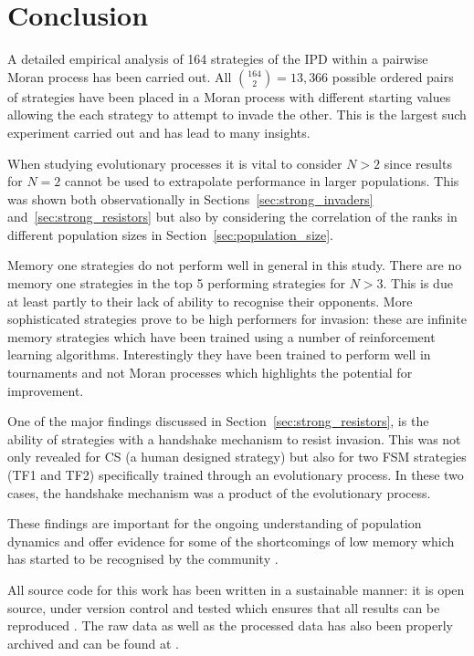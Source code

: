\documentclass{article}
\begin{document}
\section{Conclusion}\label{sec:conclusion}

A detailed empirical analysis of 164 strategies of the IPD within a pairwise
Moran process has been carried out. All \(\binom{164}{2}=13,366\) possible
ordered pairs of strategies have been placed in a Moran process with different
starting values allowing the each strategy to attempt to invade the other.
This is the largest such experiment carried out and has lead to many insights.

When studying evolutionary processes it is vital to consider \(N>2\) since
results for \(N=2\) cannot be used to extrapolate performance in larger
populations. This was shown both observationally in
Sections~\ref{sec:strong_invaders} and~\ref{sec:strong_resistors} but also by
considering the correlation of the ranks in different population sizes in
Section~\ref{sec:population_size}.

Memory one strategies do not perform well in general in this study. There are
no memory one strategies in the top 5 performing strategies
for \(N>3\). This is due at least partly to their lack of ability to
recognise their opponents. More sophisticated strategies
prove to be high performers for invasion: these are infinite memory strategies
which have been trained using a number of reinforcement learning algorithms.
Interestingly they have been trained to perform well in tournaments and not
Moran processes which highlights the potential for improvement.

One of the major findings discussed in Section~\ref{sec:strong_resistors}, is
the ability of strategies with a handshake mechanism to resist invasion. This
was not only revealed for CS (a human designed strategy) but also for
two FSM strategies (TF1 and TF2) specifically trained through an evolutionary
process. In these two cases, the handshake mechanism was a product of the
evolutionary process.

These findings are important for the ongoing understanding of
population dynamics and offer evidence for some of the shortcomings of low
memory which has started to be recognised by the community \cite{Hilbe2017}.

All source code for this work has been written in a sustainable manner: it is
open source, under version control and tested which ensures that all results can
be reproduced \cite{Prlic2012, Sandve2013, Wilson2014}. The raw data as well as
the processed data has also been properly archived and can be found
at \cite{data}.
\end{document}
